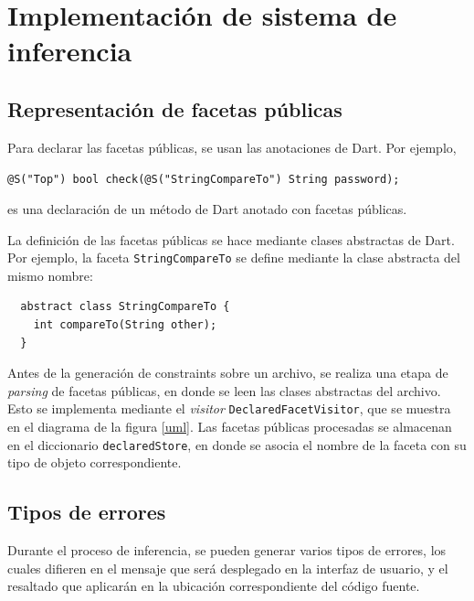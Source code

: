 \section{Implementación de sistema de inferencia}

\subsection{Representación de facetas públicas}
Para declarar las facetas públicas, se usan las anotaciones de Dart. Por ejemplo,

 \texttt{@S("Top") bool check(@S("StringCompareTo") String password);}

 es una declaración de un método de Dart anotado con facetas públicas.

La definición de las facetas públicas se hace mediante clases abstractas de Dart. Por ejemplo, la faceta \texttt{StringCompareTo} se define mediante la clase abstracta del mismo nombre:

\begin{lstlisting}
  abstract class StringCompareTo {
    int compareTo(String other);
  }
\end{lstlisting}

Antes de la generación de constraints sobre un archivo, se realiza una etapa de \textit{parsing} de facetas públicas, en donde se leen las clases abstractas del archivo. Esto se implementa mediante el \emph{visitor} \texttt{DeclaredFacetVisitor}, que se muestra en el diagrama de la figura \ref{uml}. Las facetas públicas procesadas se almacenan en el diccionario \texttt{declaredStore}, en donde se asocia el nombre de la faceta con su tipo de objeto correspondiente.

\subsection{Tipos de errores}
Durante el proceso de inferencia, se pueden generar varios tipos de errores, los cuales difieren en el mensaje que será desplegado en la interfaz de usuario, y el resaltado que aplicarán en la ubicación correspondiente del código fuente.

